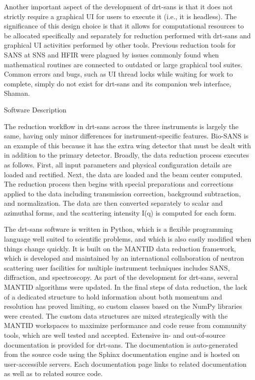 Another important aspect of the development of drt-sans is that it does not strictly require a
graphical UI for users to execute it (i.e., it is headless). The significance of this design choice
is that it allows for computational resources to be allocated specifically and separately for
reduction performed with drt-sans and graphical UI activities performed by other tools. Previous
reduction tools for SANS at SNS and HFIR were plagued by issues commonly found when mathematical
routines are connected to outdated or large graphical tool suites. Common errors and bugs, such as
UI thread locks while waiting for work to complete, simply do not exist for drt-sans and its
companion web interface, Shaman.

Software Description

The reduction workflow in drt-sans across the three instruments is largely the same, having only
minor differences for instrument-specific features. Bio-SANS is an example of this because it has
the extra wing detector that must be dealt with in addition to the primary detector. Broadly, the
data reduction process executes as follows. First, all input parameters and physical configuration
details are loaded and rectified. Next, the data are loaded and the beam center computed. The
reduction process then begins with special preparations and corrections applied to the data
including transmission correction, background subtraction, and normalization. The data are then
converted separately to scalar and azimuthal forms, and the scattering intensity I(q) is computed
for each form. 

The drt-sans software is written in Python, which is a flexible programming language well suited to
scientific problems, and which is also easily modified when things change quickly. It is built on
the MANTID data reduction framework, which is developed and maintained by an international
collaboration of neutron scattering user facilities for multiple instrument techniques includes
SANS, diffraction, and spectroscopy. As part of the development for drt-sans, several MANTID
algorithms were updated. In the final steps of data reduction, the lack of a dedicated structure to
hold information about both momentum and resolution has proved limiting, so custom classes based on
the NumPy libraries were created. The custom data structures are mixed strategically with the MANTID
workspaces to maximize performance and code reuse from community tools, which are well tested and
accepted. Extensive in- and out-of-source documentation is provided for drt-sans. The documentation
is auto-generated from the source code using the Sphinx documentation engine and is hosted on
user-accessible servers. Each documentation page links to related documentation as well as to
related source code.

